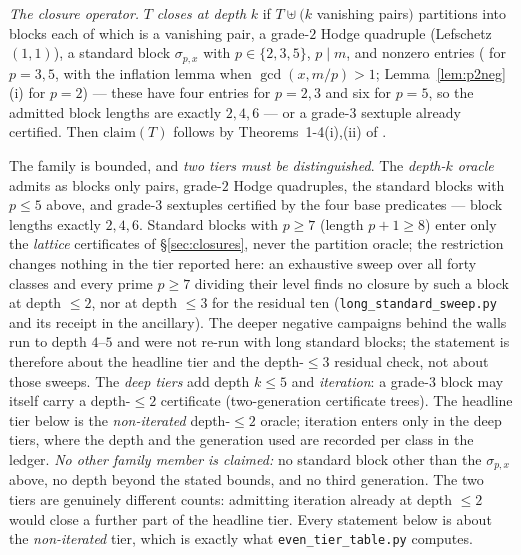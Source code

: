 \documentclass[11pt]{amsart}
\theoremstyle{remark}
\begin{document}
\emph{The closure operator.} $T$ \emph{closes at depth} $k$ if $T\uplus(k$ vanishing pairs$)$
partitions into blocks each of which is a vanishing pair, a grade-$2$ Hodge quadruple (Lefschetz
$(1,1)$), a standard block $\sigma_{p,x}$ with $p\in\{2,3,5\}$, $p\mid m$, and nonzero entries
(\cite[Thm.~2-1]{Aoki87} for $p=3,5$, with the inflation lemma when $\gcd(x,m/p)>1$;
Lemma~\ref{lem:p2neg}(i) for $p=2$) --- these have four entries for $p=2,3$ and six for $p=5$,
so the admitted block lengths are exactly $2,4,6$ --- or a grade-$3$ sextuple already
certified. Then $\mathrm{claim}(T)$ follows by Theorems~1-4(i),(ii) of \cite{Aoki87}.

The family is bounded, and \emph{two tiers must be distinguished}. The \emph{depth-$k$ oracle}
admits as blocks only pairs, grade-$2$ Hodge quadruples, the standard blocks with $p\le5$ above,
and grade-$3$ sextuples certified by the four base predicates --- block lengths exactly $2,4,6$.
Standard blocks with $p\ge7$ (length $p+1\ge8$) enter only the \emph{lattice} certificates of
\S\ref{sec:closures}, never the partition oracle; the restriction changes nothing in the tier reported
here: an exhaustive sweep over all forty classes and every prime $p\ge7$ dividing their level
finds no closure by such a block at depth $\le2$, nor at depth $\le3$ for the residual ten
(\texttt{long\_standard\_sweep.py} and its receipt in the ancillary). The deeper negative
campaigns behind the walls run to depth $4$--$5$ and were not re-run with long standard blocks;
the statement is therefore about the headline tier and the depth-$\le3$ residual check, not about
those sweeps. The \emph{deep tiers} add depth $k\le5$ and \emph{iteration}: a
grade-$3$ block may itself carry a depth-$\le2$ certificate (two-generation certificate trees).
The headline tier below is the \emph{non-iterated} depth-$\le2$ oracle; iteration enters only
in the deep tiers, where the depth and the generation used are recorded per class in the ledger.
\emph{No other family member is claimed:} no standard block other than the $\sigma_{p,x}$
above, no depth beyond the stated bounds, and no third generation. The two tiers are genuinely
different counts: admitting iteration already at depth $\le2$ would close a further part of the
headline tier. Every statement below is about the \emph{non-iterated} tier, which is exactly
what \texttt{even\_tier\_table.py} computes.
\end{document}

